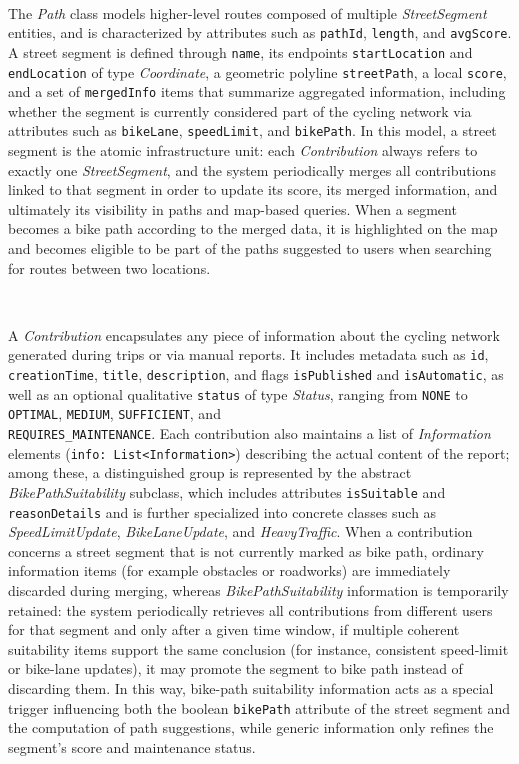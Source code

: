 ​

The \textit{Path} class models higher-level routes composed of multiple \textit{StreetSegment} entities, and is characterized by attributes such as \texttt{pathId}, \texttt{length}, and \texttt{avgScore}. A street segment is defined through \texttt{name}, its endpoints \texttt{startLocation} and \texttt{endLocation} of type \textit{Coordinate}, a geometric polyline \texttt{streetPath}, a local \texttt{score}, and a set of \texttt{mergedInfo} items that summarize aggregated information, including whether the segment is currently considered part of the cycling network via attributes such as \texttt{bikeLane}, \texttt{speedLimit}, and \texttt{bikePath}. In this model, a street segment is the atomic infrastructure unit: each \textit{Contribution} always refers to exactly one \textit{StreetSegment}, and the system periodically merges all contributions linked to that segment in order to update its score, its merged information, and ultimately its visibility in paths and map-based queries. When a segment becomes a bike path according to the merged data, it is highlighted on the map and becomes eligible to be part of the paths suggested to users when searching for routes between two locations.

​

A \textit{Contribution} encapsulates any piece of information about the cycling network generated during trips or via manual reports. It includes metadata such as \texttt{id}, \texttt{creationTime}, \texttt{title}, \texttt{description}, and flags \texttt{isPublished} and \texttt{isAutomatic}, as well as an optional qualitative \texttt{status} of type \textit{Status}, ranging from \texttt{NONE} to \texttt{OPTIMAL}, \texttt{MEDIUM}, \texttt{SUFFICIENT}, and \\\texttt{REQUIRES\_MAINTENANCE}. Each contribution also maintains a list of \textit{Information} elements (\texttt{info: List<Information>}) describing the actual content of the report; among these, a distinguished group is represented by the abstract \textit{BikePathSuitability} subclass, which includes attributes \texttt{isSuitable} and \texttt{reasonDetails} and is further specialized into concrete classes such as \textit{SpeedLimitUpdate}, \textit{BikeLaneUpdate}, and \textit{HeavyTraffic}. When a contribution concerns a street segment that is not currently marked as bike path, ordinary information items (for example obstacles or roadworks) are immediately discarded during merging, whereas \textit{BikePathSuitability} information is temporarily retained: the system periodically retrieves all contributions from different users for that segment and only after a given time window, if multiple coherent suitability items support the same conclusion (for instance, consistent speed-limit or bike-lane updates), it may promote the segment to bike path instead of discarding them. In this way, bike-path suitability information acts as a special trigger influencing both the boolean \texttt{bikePath} attribute of the street segment and the computation of path suggestions, while generic information only refines the segment’s score and maintenance status.

